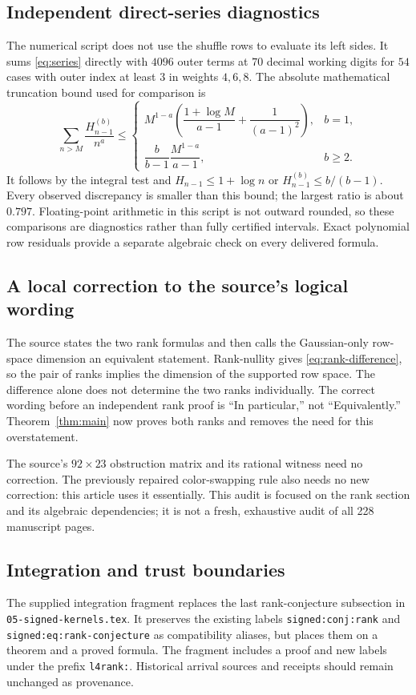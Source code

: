 \documentclass[11pt,a4paper]{article}
\numberwithin{equation}{section}
\theoremstyle{definition}\newtheorem{definition}[theorem]{Definition}
\theoremstyle{remark}\newtheorem{remark}[theorem]{Remark}
\newcommand{\pathtext}[1]{\nolinkurl{#1}}
\begin{document}
\subsection{Independent direct-series diagnostics}
The numerical script does not use the shuffle rows to evaluate its left
sides. It sums \eqref{eq:series} directly with $4096$ outer terms at $70$
decimal working digits for $54$ cases with outer index at least $3$ in
weights $4,6,8$. The absolute mathematical truncation bound used for
comparison is
\[
\sum_{n>M}\frac{H_{n-1}^{(b)}}{n^a}\le
\begin{cases}
M^{1-a}\left(\dfrac{1+\log M}{a-1}+\dfrac1{(a-1)^2}\right),&b=1,\\[4pt]
\dfrac{b}{b-1}\dfrac{M^{1-a}}{a-1},&b\ge2.
\end{cases}
\]
It follows by the integral test and $H_{n-1}\le1+\log n$ or
$H_{n-1}^{(b)}\le b/(b-1)$. Every observed discrepancy is smaller than this
bound; the largest ratio is about $0.797$. Floating-point arithmetic in this
script is not outward rounded, so these comparisons are diagnostics rather
than fully certified intervals. Exact polynomial row residuals provide a
separate algebraic check on every delivered formula.

\subsection{A local correction to the source's logical wording}
The source states the two rank formulas and then calls the Gaussian-only
row-space dimension an equivalent statement. Rank-nullity gives
\eqref{eq:rank-difference}, so the pair of ranks implies the dimension of
the supported row space. The difference alone does not determine the two
ranks individually. The correct wording before an independent rank proof is
``In particular,'' not ``Equivalently.'' Theorem~\ref{thm:main} now proves
both ranks and removes the need for this overstatement.

The source's $92\times23$ obstruction matrix and its rational witness need
no correction. The previously repaired color-swapping rule also needs no
new correction: this article uses it essentially. This audit is focused on
the rank section and its algebraic dependencies; it is not a fresh,
exhaustive audit of all 228 manuscript pages.

\subsection{Integration and trust boundaries}
The supplied integration fragment replaces the last rank-conjecture
subsection in \pathtext{05-signed-kernels.tex}. It preserves the existing
labels \pathtext{signed:conj:rank} and
\pathtext{signed:eq:rank-conjecture} as compatibility aliases, but places
them on a theorem and a proved formula. The fragment includes a proof and
new labels under the prefix \pathtext{l4rank:}. Historical arrival sources
and receipts should remain unchanged as provenance.
\end{document}
